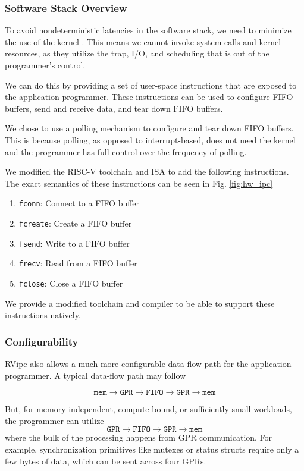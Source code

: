 \subsubsection{Software Stack Overview}
To avoid nondeterministic latencies in the software stack, we need to minimize the use of the kernel \cite{Jia:ATC24:TraplessKprobes}. This means we cannot invoke system calls and kernel resources, as they utilize the trap, I/O, and scheduling that is out of the programmer's control.

We can do this by providing a set of user-space instructions that are exposed to the application programmer. These instructions can be used to configure FIFO buffers, send and receive data, and tear down FIFO buffers. 

We chose to use a polling mechanism to configure and tear down FIFO buffers. This is because polling, as opposed to interrupt-based, does not need the kernel and the programmer has full control over the frequency of polling. 

We modified the RISC-V toolchain and ISA \cite{Waterman:RISC-V:2019} to add the following instructions. The exact semantics of these instructions can be seen in Fig. \ref{fig:hw_ipc}
\begin{enumerate}
  \item \texttt{fconn}: Connect to a FIFO buffer
  \item \texttt{fcreate}: Create a FIFO buffer
  \item \texttt{fsend}: Write to a FIFO buffer
  \item \texttt{frecv}: Read from a FIFO buffer
  \item \texttt{fclose}: Close a FIFO buffer
\end{enumerate}

We provide a modified toolchain and compiler to be able to support these instructions natively.

\subsubsection{Configurability}
RVipc also allows a much more configurable data-flow path for the application programmer. A typical data-flow path may follow 

\begin{equation}
  \texttt{mem} \rightarrow \texttt{GPR} \rightarrow \texttt{FIFO} \rightarrow \texttt{GPR} \rightarrow \texttt{mem}
\end{equation}

But, for memory-independent, compute-bound, or sufficiently small workloads, the programmer can utilize
\begin{equation}
  \texttt{GPR} \rightarrow \texttt{FIFO} \rightarrow \texttt{GPR} \rightarrow \texttt{mem}
\end{equation}
where the bulk of the processing happens from GPR communication. For example, synchronization primitives like mutexes or status structs require only a few bytes of data, which can be sent across four GPRs.

